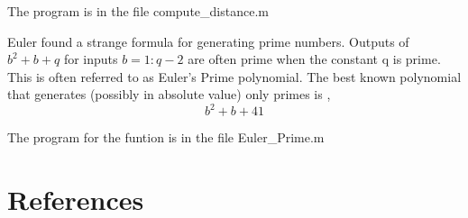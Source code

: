 \documentclass[fleqn,letterpaper,12pt]{report}
\begin{document}
The program is in the file {\color{blue} compute\_distance.m}
%

\newpage
\clearpage
{}
{}
\problem
Euler found a strange formula for generating prime numbers. Outputs of $ b^2+b+q $ for inputs $ b = 1:q-2 $ are often prime when the constant q is prime. This is often referred to as Euler's Prime polynomial. The best known polynomial that generates (possibly in absolute value) only
 primes is \cite{EP}, $$b^2+b+41$$

The program for the funtion is in the file {\color{blue} Euler\_Prime.m}


\newpage
{}
\section*{References}


\end{document}
